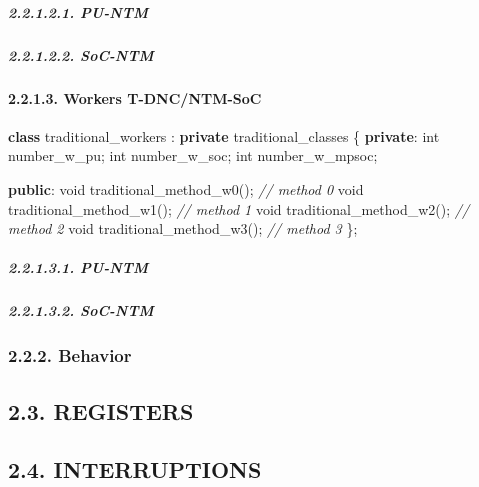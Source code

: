 \documentclass[
]{article}
\newenvironment{Shaded}{}{}
\newcommand{\CommentTok}[1]{\textcolor[rgb]{0.38,0.63,0.69}{\textit{#1}}}
\newcommand{\DataTypeTok}[1]{\textcolor[rgb]{0.56,0.13,0.00}{#1}}
\newcommand{\KeywordTok}[1]{\textcolor[rgb]{0.00,0.44,0.13}{\textbf{#1}}}
\newcommand{\NormalTok}[1]{#1}
\begin{document}
\hypertarget{pu-ntm-4}{%
\subparagraph{2.2.1.2.1. PU-NTM}\label{pu-ntm-4}}

\hypertarget{soc-ntm-4}{%
\subparagraph{2.2.1.2.2. SoC-NTM}\label{soc-ntm-4}}

\hypertarget{workers-t-dncntm-soc}{%
\paragraph{2.2.1.3. Workers T-DNC/NTM-SoC}\label{workers-t-dncntm-soc}}

\begin{Shaded}
\begin{Highlighting}[]
\KeywordTok{class}\NormalTok{ traditional\_workers : }\KeywordTok{private}\NormalTok{ traditional\_classes \{}
   \KeywordTok{private}\NormalTok{:}
      \DataTypeTok{int}\NormalTok{ number\_w\_pu;}
      \DataTypeTok{int}\NormalTok{ number\_w\_soc;}
      \DataTypeTok{int}\NormalTok{ number\_w\_mpsoc;}

   \KeywordTok{public}\NormalTok{:}
      \DataTypeTok{void}\NormalTok{ traditional\_method\_w0();  }\CommentTok{// method 0}
      \DataTypeTok{void}\NormalTok{ traditional\_method\_w1();  }\CommentTok{// method 1}
      \DataTypeTok{void}\NormalTok{ traditional\_method\_w2();  }\CommentTok{// method 2}
      \DataTypeTok{void}\NormalTok{ traditional\_method\_w3();  }\CommentTok{// method 3}
\NormalTok{\};}
\end{Highlighting}
\end{Shaded}

\hypertarget{pu-ntm-5}{%
\subparagraph{2.2.1.3.1. PU-NTM}\label{pu-ntm-5}}

\hypertarget{soc-ntm-5}{%
\subparagraph{2.2.1.3.2. SoC-NTM}\label{soc-ntm-5}}

\hypertarget{behavior-1}{%
\subsubsection{2.2.2. Behavior}\label{behavior-1}}

\hypertarget{registers-1}{%
\subsection{2.3. REGISTERS}\label{registers-1}}

\hypertarget{interruptions-1}{%
\subsection{2.4. INTERRUPTIONS}\label{interruptions-1}}
\end{document}

